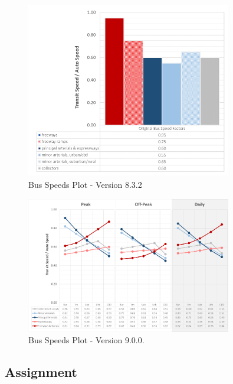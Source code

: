 \documentclass[
  letterpaper,
  DIV=11,
  numbers=noendperiod]{scrreprt}
\begin{document}
\begin{figure}[H]

{\centering \includegraphics[width=0.8\textwidth,height=\textheight]{v9x/v900/whats-new/_pictures/old_bus_speeds.png}

}

\caption{\label{fig-pdf-old-bus-speeds-plot}Bus Speeds Plot - Version
8.3.2}

\end{figure}

\begin{figure}[H]

{\centering \includegraphics[width=0.8\textwidth,height=\textheight]{v9x/v900/whats-new/_pictures/pdf-bus-speeds-plot.png}

}

\caption{\label{fig-pdf-bus-speeds-plot}Bus Speeds Plot - Version
9.0.0.}

\end{figure}

\hypertarget{assignment}{%
\subsection{Assignment}\label{assignment}}
\end{document}
